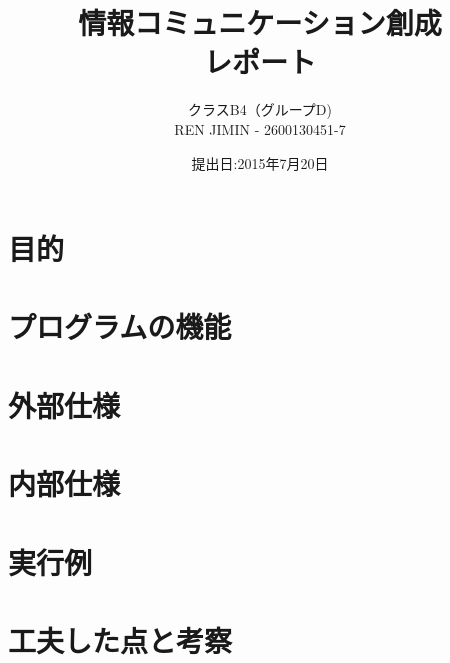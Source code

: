 \documentclass{jarticle}
\title{情報コミュニケーション創成\\レポート}
\author{クラスB4（グループD)\\REN JIMIN - 2600130451-7}
\date{提出日:2015年7月20日}
\begin{document}
\maketitle
\tableofcontents
\clearpage

\section{目的}
	
\section{プログラムの機能}
	
\section{外部仕様}
	
\section{内部仕様}
	
\section{実行例}
	
\section{工夫した点と考察}
		
\end{document}
